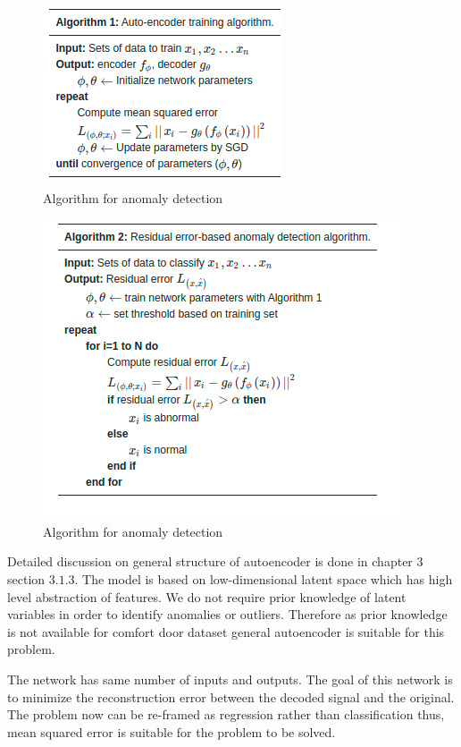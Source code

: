     \begin{figure}[h]
    	\centering
    	\includegraphics[width=0.5\linewidth]{images/algau.png}
    	\caption{Algorithm for anomaly detection \cite{oh2018residual} }
    	\label{nv0}
    \end{figure}
    
     \begin{figure}[h]
     	\centering
     	\includegraphics[width=0.75\linewidth]{images/rsd.png}
     	\caption{Algorithm for anomaly detection \cite{oh2018residual} }
     	\label{n00}
     \end{figure}
   
   Detailed discussion on general structure of autoencoder is done in chapter 3 section $3.1.3$. The model is based on low-dimensional latent space which has high level abstraction of features. We do not require prior knowledge of latent variables in order to identify anomalies or outliers. Therefore as prior knowledge is not available for comfort door dataset general autoencoder is suitable for this problem.
   
   The network has same number of inputs and outputs. The goal of this network is to minimize the reconstruction error between the decoded signal and the original. The problem now can be re-framed as regression rather than classification thus, mean squared error is suitable for the problem to be solved.     
   
